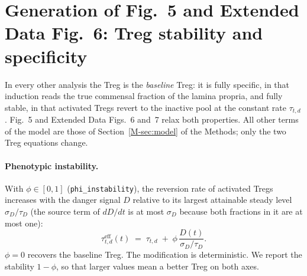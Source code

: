 \documentclass[11pt]{article}
\begin{document}
\section{Generation of Fig.~5 and Extended Data Fig.~6: Treg stability and specificity}
\label{sec:fig7}


In every other analysis the Treg is the \emph{baseline} Treg: it is fully specific,
in that induction reads the true commensal fraction of the lamina propria, and fully
stable, in that activated Tregs revert to the inactive pool at the constant rate
$\tau_{t,d}$. Fig.~5 and Extended Data Figs.~6 and~7 relax both properties. All other terms of the model are those
of Section~\ref{M-sec:model} of the Methods; only the two Treg equations change.

\paragraph{Phenotypic instability.}
With $\phi \in [0,1]$ (\texttt{phi\_instability}), the reversion rate of
activated Tregs increases with the danger signal $D$ relative to its largest
attainable steady level $\sigma_D/\tau_D$ (the source term of $dD/dt$ is at most
$\sigma_D$ because both fractions in it are at most one):
\begin{equation}
  \tau_{t,d}^{\mathrm{eff}}(t) \;=\; \tau_{t,d} \;+\; \phi\,\frac{D(t)}{\sigma_D/\tau_D}.
  \label{eq:imp-phi}
\end{equation}
$\phi = 0$ recovers the baseline Treg. The modification is deterministic. We
report the stability $1-\phi$, so that larger values mean a better Treg on both
axes.
\end{document}
